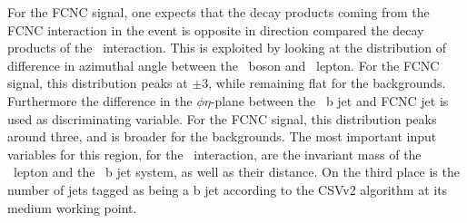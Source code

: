    
   For the FCNC signal, one expects that the decay products coming from the FCNC interaction in the event is opposite in direction compared the decay products of the \SM\ interaction. This is exploited by looking at the distribution of difference in azimuthal angle between the  \PZ\ boson and  \PW\ lepton. For the FCNC signal, this distribution peaks at $\pm 3$, while remaining flat for the backgrounds. Furthermore the difference in the $\phi\eta$-plane between the \SM\ b jet and FCNC jet is used as discriminating variable. For the FCNC signal, this distribution peaks around three, and is broader for the backgrounds.  The most important input variables for this region, for the \Zut\ interaction, are the invariant mass of the \PW\ lepton and the \SM\ b jet system, as well as their distance. On the third place is the number of jets tagged as being a b jet according to the CSVv2 algorithm at its medium working point. 

